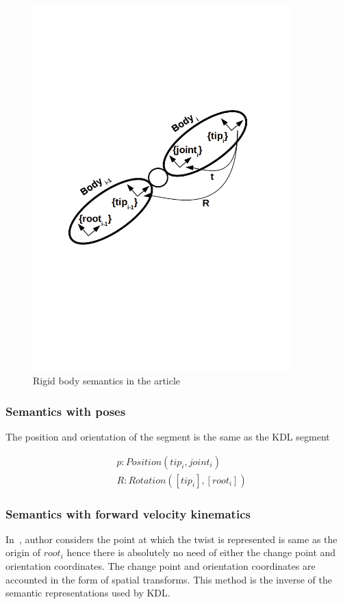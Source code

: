 \begin{figure}[h]
\centering
\includegraphics[width=100mm, trim=0 250 0 250]{pictures/featherstone_rigidbodyi}
\caption{Rigid body semantics in the article~\cite{featherstone2014rigid}}
\end{figure}

\subsubsection*{Semantics with poses}
The position and orientation of the segment is the same as the KDL segment 

\begin{equation}
\begin{aligned}
& p : Position (tip_i, joint_i) \\
& R : Rotation ([tip_i], [root_i])
\end{aligned}
\end{equation}

\subsubsection*{Semantics with forward velocity kinematics}

In~\cite{featherstone2014rigid}, author considers the point at which the twist is represented is same as the origin of $root_i$ hence there is absolutely no need of either the change point and orientation coordinates. The change point and orientation coordinates are accounted in the form of spatial transforms. This method is the inverse of the semantic representations used by KDL.

